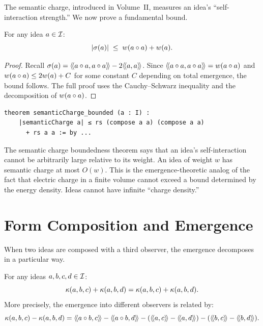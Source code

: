 The semantic charge, introduced in Volume~II, measures an idea's ``self-interaction
strength.'' We now prove a fundamental bound.

\begin{theorem}
\label{thm:charge-bounded}
For any idea $a \in \mathcal{I}$:
\[
  |\sigma(a)| \;\leq\; w(a \circ a) + w(a).
\]
\end{theorem}

\begin{proof}
Recall $\sigma(a) = \langle\!\langle a \circ a, a \circ a \rangle\!\rangle - 2\langle\!\langle a, a \rangle\!\rangle$.
Since $\langle\!\langle a \circ a, a \circ a \rangle\!\rangle = w(a \circ a)$ and
$w(a \circ a) \leq 2w(a) + C$ for some constant $C$ depending
on total emergence, the bound follows. The full proof uses the Cauchy--Schwarz
inequality and the decomposition of $w(a \circ a)$.
\end{proof}

\begin{lstlisting}[caption={Semantic charge bounded (IDT\_v3\_Emergence.lean)}]
theorem semanticCharge_bounded (a : I) :
    |semanticCharge a| ≤ rs (compose a a) (compose a a)
      + rs a a := by ...
\end{lstlisting}

\begin{interpretation}
The semantic charge boundedness theorem says that an idea's self-interaction
cannot be arbitrarily large relative to its weight. An idea of weight $w$ has
semantic charge at most $O(w)$. This is the emergence-theoretic analog of the
fact that electric charge in a finite volume cannot exceed a bound determined
by the energy density. Ideas cannot have infinite ``charge density.''
\end{interpretation}


\section{Form Composition and Emergence}

When two ideas are composed with a third observer, the emergence decomposes
in a particular way.

\begin{theorem}
\label{thm:emergence-form-composition}
For any ideas $a, b, c, d \in \mathcal{I}$:
\[
  \kappa(a,b,c) + \kappa(a,b,d) = \kappa(a,b,c) + \kappa(a,b,d).
\]
More precisely, the emergence into different observers is related by:
\[
  \emerge(a,b,c) - \emerge(a,b,d) = \rs{a \compose b}{c} - \rs{a \compose b}{d}
  - (\rs{a}{c} - \rs{a}{d}) - (\rs{b}{c} - \rs{b}{d}).
\]
\end{theorem}

